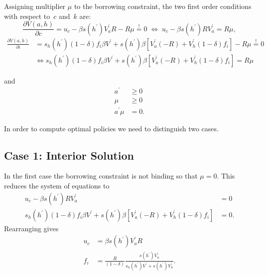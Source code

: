 \documentclass[a4paper,12pt]{article}%
\begin{document}
Assigning multiplier $\mu$ to the borrowing constraint, the two first order
conditions with respect to~$c$ and~$k$ are:
\begin{equation}
\frac{\partial V\left(  a,h\right)  }{\partial c}=u_{c}-\beta s\left(
h^{\prime}\right)  V_{a}^{\prime}R-R\mu\overset{!}{=}0\;\Leftrightarrow
\;u_{c}-\beta s\left(  h^{\prime}\right)  RV_{a}^{\prime}=R\mu, \label{FOC1}%
\end{equation}%
\begin{align}
\frac{\partial V\left(  a,h\right)  }{\partial i}  &  =s_{h}\left(  h^{\prime
}\right)  \left(  1-\delta\right)  f_{i}\beta V^{\prime}+s\left(  h^{\prime
}\right)  \beta\left[  V_{a}^{\prime}\left(  -R\right)  +V_{h}^{\prime}\left(
1-\delta\right)  f_{i}\right]  -R\mu\overset{!}{=}0\nonumber\\
&  \Leftrightarrow s_{h}\left(  h^{\prime}\right)  \left(  1-\delta\right)
f_{i}\beta V^{\prime}+s\left(  h^{\prime}\right)  \beta\left[  V_{a}^{\prime
}\left(  -R\right)  +V_{h}^{\prime}\left(  1-\delta\right)  f_{i}\right]
=R\mu\label{FOC2}%
\end{align}


and%
\begin{align*}
a^{\prime}  &  \geq0\\
\mu &  \geq0\\
a^{\prime}\mu &  =0.
\end{align*}


In order to compute optimal policies we need to distinguish two cases.

\subsection*{Case 1: Interior Solution}

In the first case the borrowing constraint is not binding so that $\mu=0$.
This reduces the system of equations to%
\begin{align*}
u_{c}-\beta s\left(  h^{\prime}\right)  RV_{a}^{\prime}  &  =0\\
s_{h}\left(  h^{\prime}\right)  \left(  1-\delta\right)  f_{i}\beta V^{\prime
}+s\left(  h^{\prime}\right)  \beta\left[  V_{a}^{\prime}\left(  -R\right)
+V_{h}^{\prime}\left(  1-\delta\right)  f_{i}\right]   &  =0.
\end{align*}
Rearranging gives
\begin{align*}
u_{c}  &  =\beta s\left(  h^{\prime}\right)  V_{a}^{\prime}R\\
f_{i}  &  =\frac{R}{\left(  1-\delta\right)  }\frac{s\left(  h^{\prime
}\right)  V_{a}^{\prime}}{s_{h}\left(  h^{\prime}\right)  V^{\prime}+s\left(
h^{\prime}\right)  V_{h}^{\prime}}.
\end{align*}
\end{document}
